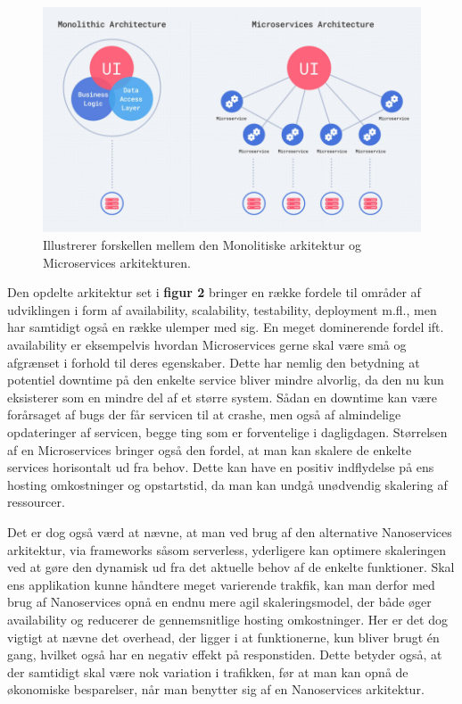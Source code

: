 \documentclass{article}
\begin{document}
\begin{flushleft}
\begin{figure}[H]
    \captionsetup{justification=raggedright,singlelinecheck=false}
    \includegraphics[width=\textwidth]{monolithic and Microservices.jpg}
    \caption{Illustrerer forskellen mellem den Monolitiske arkitektur og Microservices arkitekturen.\cite{micro8}  \label{figure:mono micro}}
\end{figure}
Den opdelte arkitektur set i \textbf{figur 2} bringer en række fordele til områder af udviklingen i form af availability, scalability, testability, deployment m.fl., men har samtidigt også en række ulemper med sig.\cite{mono2} En meget dominerende fordel ift. availability er eksempelvis hvordan Microservices gerne skal være små og afgrænset i forhold til deres egenskaber.\cite{micro1} Dette har nemlig den betydning at potentiel downtime på den enkelte service bliver mindre alvorlig, da den nu kun eksisterer som en mindre del af et større system. Sådan en downtime kan være forårsaget af bugs der får servicen til at crashe, men også af almindelige opdateringer af servicen, begge ting som er forventelige i dagligdagen. Størrelsen af en Microservices bringer også den fordel, at man kan skalere de enkelte services horisontalt ud fra behov. Dette kan have en positiv indflydelse på ens hosting omkostninger og opstartstid, da man kan undgå unødvendig skalering af ressourcer.\cite{micro9} \linebreak

Det er dog også værd at nævne, at man ved brug af den alternative Nanoservices arkitektur\cite{nano}, via frameworks såsom serverless\cite{serverless}, yderligere kan optimere skaleringen ved at gøre den dynamisk ud fra det aktuelle behov af de enkelte funktioner. Skal ens applikation kunne håndtere meget varierende trakfik, kan man derfor med brug af Nanoservices opnå en endnu mere agil skaleringsmodel, der både øger availability og reducerer de gennemsnitlige hosting omkostninger.\cite{micro3} Her er det dog vigtigt at nævne det overhead, der ligger i at funktionerne, kun bliver brugt én gang, hvilket også har en negativ effekt på responstiden. Dette betyder også, at der samtidigt skal være nok variation i trafikken, før at man kan opnå de økonomiske besparelser, når man benytter sig af en Nanoservices arkitektur.\linebreak


\end{flushleft}
\end{document}
